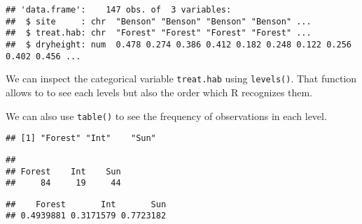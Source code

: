 \documentclass[
]{article}
\newenvironment{Shaded}{\begin{snugshade}}{\end{snugshade}}
\newcommand{\FunctionTok}[1]{\textcolor[rgb]{0.00,0.00,0.00}{#1}}
\newcommand{\NormalTok}[1]{#1}
\newcommand{\OtherTok}[1]{\textcolor[rgb]{0.56,0.35,0.01}{#1}}
\newcommand{\SpecialCharTok}[1]{\textcolor[rgb]{0.00,0.00,0.00}{#1}}
\begin{document}
\begin{verbatim}
## 'data.frame':    147 obs. of  3 variables:
##  $ site     : chr  "Benson" "Benson" "Benson" "Benson" ...
##  $ treat.hab: chr  "Forest" "Forest" "Forest" "Forest" ...
##  $ dryheight: num  0.478 0.274 0.386 0.412 0.182 0.248 0.122 0.256 0.402 0.456 ...
\end{verbatim}

We can inspect the categorical variable \texttt{treat.hab} using
\texttt{levels()}. That function allows to to see each levels but also
the order which R recognizes them.

We can also use \texttt{table()} to see the frequency of observations in
each level.

\begin{Shaded}
\end{Shaded}

\begin{verbatim}
## [1] "Forest" "Int"    "Sun"
\end{verbatim}

\begin{Shaded}
\end{Shaded}

\begin{verbatim}
## 
## Forest    Int    Sun 
##     84     19     44
\end{verbatim}

\begin{Shaded}
\end{Shaded}

\begin{verbatim}
##    Forest       Int       Sun 
## 0.4939881 0.3171579 0.7723182
\end{verbatim}
\end{document}
